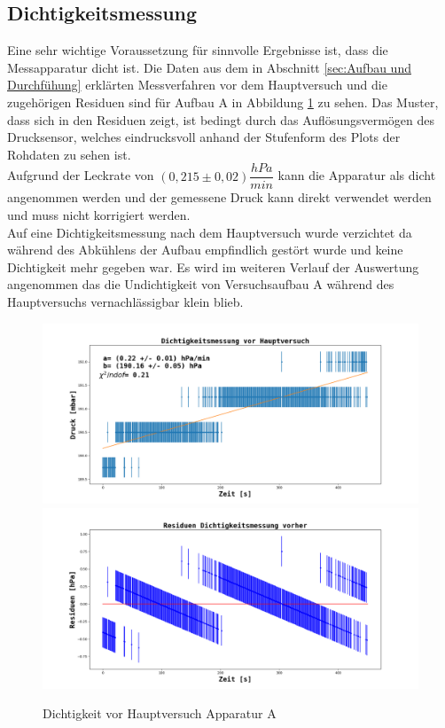 \documentclass[12pt,a4paper]{article}
\begin{document}
\subsection{Dichtigkeitsmessung}
Eine sehr wichtige Voraussetzung für sinnvolle Ergebnisse ist, dass die Messapparatur dicht ist. Die Daten aus dem in Abschnitt \ref{sec:Aufbau und Durchfühung} erklärten Messverfahren vor dem Hauptversuch und die zugehörigen Residuen sind für Aufbau A in Abbildung \ref{fig:DichtigkeitA} zu sehen. Das Muster, dass sich in den Residuen zeigt, ist bedingt durch das Auflösungsvermögen des Drucksensor, welches eindrucksvoll anhand der Stufenform des Plots der Rohdaten zu sehen ist. \\
Aufgrund der Leckrate von $(0,215 \pm 0,02) \dfrac{hPa}{min}$ kann die Apparatur als dicht angenommen werden und der gemessene Druck kann direkt verwendet werden und muss nicht korrigiert werden.\\
Auf eine Dichtigkeitsmessung nach dem Hauptversuch wurde verzichtet da während des Abkühlens der Aufbau empfindlich gestört wurde und keine Dichtigkeit mehr gegeben war. Es wird im weiteren Verlauf der Auswertung angenommen das die Undichtigkeit von Versuchsaufbau A während des Hauptversuchs vernachlässigbar klein blieb.

\begin{figure}
\centering
\includegraphics[width=\linewidth]{Bilder/Dichtigkeit_vorher_A.png}
\includegraphics[width=\linewidth]{Bilder/Residuen_Dichtigkeit_vorher_A.png}
\caption[Dichtigkeit vor Hauptversuch Apparatur A]{Dichtigkeit vor Hauptversuch Apparatur A}
\label{fig:DichtigkeitA}
\end{figure}
\end{document}
